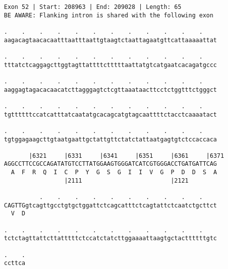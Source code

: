 \documentclass{article}
\begin{document}
\newpage
\begin{Verbatim}
Exon 52 | Start: 208963 | End: 209028 | Length: 65
BE AWARE: Flanking intron is shared with the following exon
 
.    .    .    .    .    .    .    .    .    .    .    .    
aagacagtaacacaatttaatttaattgtaagtctaattagaatgttcattaaaaattat
  
.    .    .    .    .    .    .    .    .    .    .    .    
tttatctcaggagcttggtagttattttctttttaattatgtcatgaatcacagatgccc
  
.    .    .    .    .    .    .    .    .    .    .    .    
aaggagtagacacaacatcttagggagtctcgttaaataacttcctctggtttctgggct
  
.    .    .    .    .    .    .    .    .    .    .    .    
tgttttttccatcatttatcaatatgcacagcatgtagcaattttctacctcaaaatact
  
.    .    .    .    .    .    .    .    .    .    .    .    
tgtggagaagcttgtaatgaattgctattgttctatctattaatgagtgtctccaccaca
  
       |6321     |6331     |6341     |6351     |6361     |6371
AGGCCTTCCGCCAGATATGTCCTTATGGAAGTGGGATCATCGTGGGACCTGATGATTCAG
  A  F  R  Q  I  C  P  Y  G  S  G  I  I  V  G  P  D  D  S  A
                 |2111                         |2121        
  
          .    .    .    .    .    .    .    .    .    .    
CAGTTGgtcagttgcctgtgctggattctcagcatttctcagtattctcaatctgcttct
  V  D                                                      
  
.    .    .    .    .    .    .    .    .    .    .    .    
tctctagttattcttatttttctccatctatcttggaaaattaagtgctacttttttgtc
  
.    .
ccttca
\end{Verbatim}
\newpage
\end{document}
